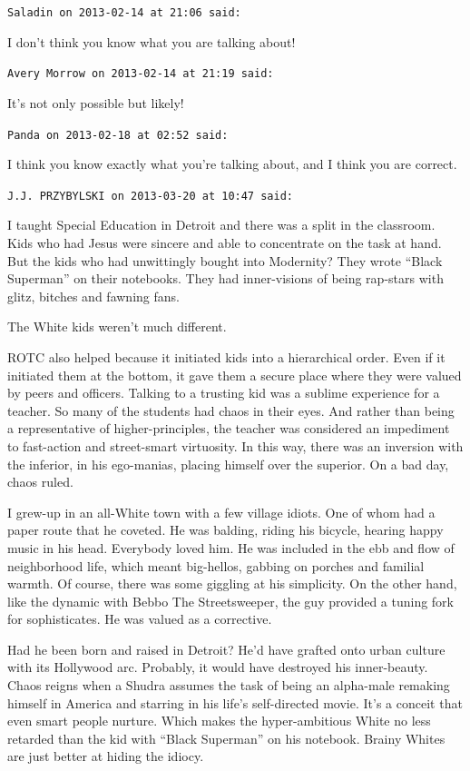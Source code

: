 \begin{footnotesize}
\begin{sffamily}
\texttt{Saladin on 2013-02-14 at 21:06 said:}

I don't think you know what you are talking about!

\hfill

\texttt{Avery Morrow on 2013-02-14 at 21:19 said:}

It's not only possible but likely!

\hfill

\texttt{Panda on 2013-02-18 at 02:52 said:}

I think you know exactly what you're talking about, and I think you are correct.

\hfill

\texttt{J.J. PRZYBYLSKI on 2013-03-20 at 10:47 said:}

I taught Special Education in Detroit and there was a split in the classroom. Kids who had Jesus were sincere and able to concentrate on the task at hand. But the kids who had unwittingly bought into Modernity? They wrote ``Black Superman'' on their notebooks. They had inner-visions of being rap-stars with glitz, bitches and fawning fans.

The White kids weren't much different.

ROTC also helped because it initiated kids into a hierarchical order. Even if it initiated them at the bottom, it gave them a secure place where they were valued by peers and officers. Talking to a trusting kid was a sublime experience for a teacher. So many of the students had chaos in their eyes. And rather than being a representative of higher-principles, the teacher was considered an impediment to fast-action and street-smart virtuosity. In this way, there was an inversion with the inferior, in his ego-manias, placing himself over the superior. On a bad day, chaos ruled.

I grew-up in an all-White town with a few village idiots. One of whom had a paper route that he coveted. He was balding, riding his bicycle, hearing happy music in his head. Everybody loved him. He was included in the ebb and flow of neighborhood life, which meant big-hellos, gabbing on porches and familial warmth. Of course, there was some giggling at his simplicity. On the other hand, like the dynamic with Bebbo The Streetsweeper, the guy provided a tuning fork for sophisticates. He was valued as a corrective.

Had he been born and raised in Detroit? He'd have grafted onto urban culture with its Hollywood arc. Probably, it would have destroyed his inner-beauty. Chaos reigns when a Shudra assumes the task of being an alpha-male remaking himself in America and starring in his life's self-directed movie. It's a conceit that even smart people nurture. Which makes the hyper-ambitious White no less retarded than the kid with ``Black Superman'' on his notebook. Brainy Whites are just better at hiding the idiocy.


\hfill

\end{sffamily}
\end{footnotesize}

